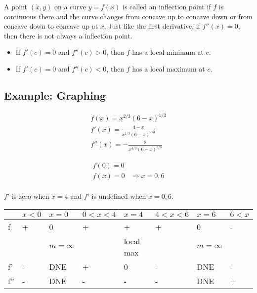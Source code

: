\documentclass{article}
\theoremstyle{mytheoremstyle}
\theoremstyle{mytheoremstyle}
\theoremstyle{myproblemstyle}
\begin{document}
    A point $(x,y)$ on a curve $y=f(x)$ is called an inflection point if $f$ is
    continuous there and the curve changes from concave up to concave down or
    from concave down to concave up at $x$. Just like the first derivative, if
    $f''(x)=0$, then there is not always a inflection point.

    \begin{itemize}
        \item If $f'(c)=0$ and $f''(c)>0$, then $f$ has a local minimum at $c$.
        \item If $f'(c)=0$ and $f''(c)<0$, then $f$ has a local maximum at $c$.
    \end{itemize}

    \subsection*{Example: Graphing}
    \begin{align*}
        f(x) = x^{2/3}(6-x)^{1/3} \\
        f'(x) = \frac{4-x}{x^{1/3}(6-x)^{2/3}} \\
        f''(x) = -\frac{8}{x^{4/3}(6-x)^{5/3}}
    \end{align*}

    \begin{align*}
        f(0) = 0 &\\
        f(x) = 0 &\Rightarrow x=0,6 \\
    \end{align*}

    $f'$ is zero when $x=4$ and $f'$ is undefined when $x=0,6$.
    \begin{center}
        \begin{tabular}[c]{l|l|l|l|l|l|l|l}
            \hline
            & $x<0$ & $x=0$ & $0<x<4$ & $x=4$ & $4<x<6$ & $x=6$ & $6<x$ \\
            \hline
            f  & + & 0   & + & + & + & 0   & - \\
            && $m=\infty$ && local max && $m=\infty$ & \\
            f' & - & DNE & + & 0 & - & DNE & - \\
            f''& - & DNE & - & - & - & DNE & + \\
            \hline
        \end{tabular}
    \end{center}

\end{document}
